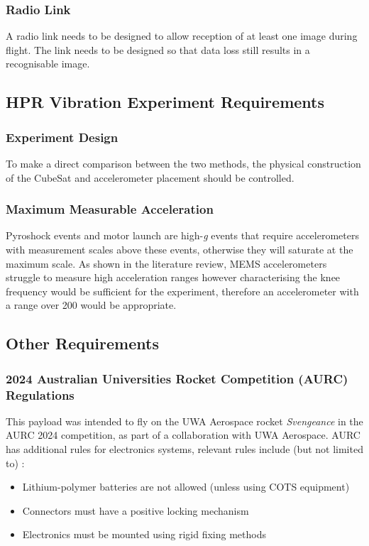 \documentclass{report}
\begin{document}
\subsubsection{Radio Link}
A radio link needs to be designed to allow reception of at least one image during flight. The link needs to be designed so that data loss still results in a recognisable image.

\subsection{HPR Vibration Experiment Requirements}

\subsubsection{Experiment Design}

To make a direct comparison between the two methods, the physical construction of the CubeSat and accelerometer placement should be controlled.

\subsubsection{Maximum Measurable Acceleration}

Pyroshock events and motor launch are high-\textit{g} events that require accelerometers with measurement scales above these events, otherwise they will saturate at the maximum scale.
As shown in the literature review, MEMS accelerometers struggle to measure high acceleration ranges however characterising the knee frequency would be sufficient for the experiment, therefore an accelerometer with a range over \SI{200}{\gacc} would be appropriate.

\subsection{Other Requirements}

\subsubsection{2024 Australian Universities Rocket Competition (AURC) Regulations}
This payload was intended to fly on the UWA Aerospace rocket \textit{Svengeance} in the AURC 2024 competition, as part of a collaboration with UWA Aerospace. AURC has additional rules for electronics systems, relevant rules include (but not limited to) \cite{ayaa2023specifications}:
\begin{itemize}
  \item Lithium-polymer batteries are not allowed (unless using COTS equipment)
  \item Connectors must have a positive locking mechanism
  \item Electronics must be mounted using rigid fixing methods
\end{itemize}
\end{document}
